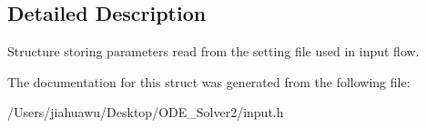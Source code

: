 \subsection{Detailed Description}
Structure storing parameters read from the setting file used in input flow. 

The documentation for this struct was generated from the following file\+:\begin{DoxyCompactItemize}
\item 
/\+Users/jiahuawu/\+Desktop/\+O\+D\+E\+\_\+\+Solver2/input.\+h\end{DoxyCompactItemize}
